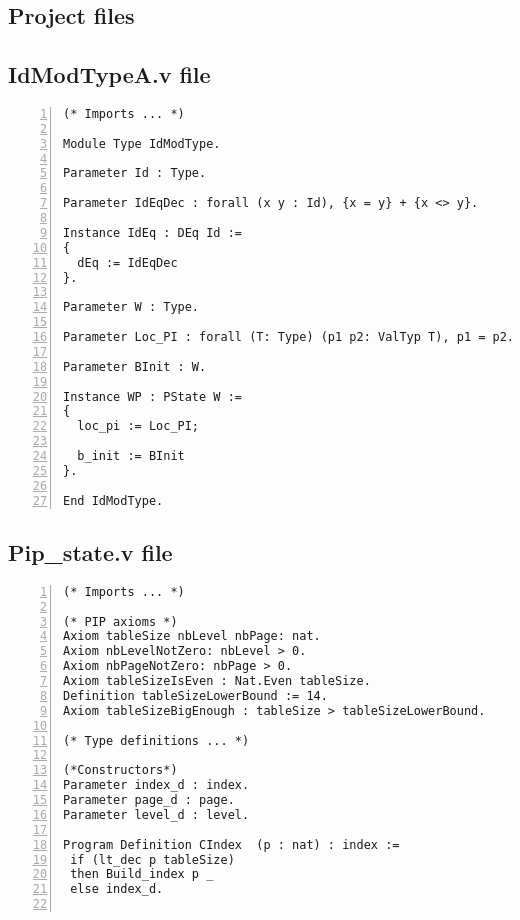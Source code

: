 \begin{appendices}

\chapter{Project files}

\section{IdModTypeA.v file} \label{ModType}
\begin{lstlisting}[xleftmargin=-.1\textwidth,
xrightmargin=-.1\textwidth,
mathescape=true,numbers=left]
(* Imports ... *)

Module Type IdModType.

Parameter Id : Type.

Parameter IdEqDec : forall (x y : Id), {x = y} + {x <> y}.

Instance IdEq : DEq Id :=
{
  dEq := IdEqDec
}.

Parameter W : Type.

Parameter Loc_PI : forall (T: Type) (p1 p2: ValTyp T), p1 = p2.

Parameter BInit : W.

Instance WP : PState W :=
{
  loc_pi := Loc_PI;
  
  b_init := BInit
}.              
  
End IdModType.
\end{lstlisting}
\pagebreak

\section{Pip\_state.v file} \label{stateFile}
\begin{lstlisting}[xleftmargin=-.1\textwidth,
xrightmargin=-.1\textwidth,
mathescape=true,numbers=left]
(* Imports ... *)

(* PIP axioms *)
Axiom tableSize nbLevel nbPage: nat.
Axiom nbLevelNotZero: nbLevel > 0.
Axiom nbPageNotZero: nbPage > 0.
Axiom tableSizeIsEven : Nat.Even tableSize.
Definition tableSizeLowerBound := 14.  
Axiom tableSizeBigEnough : tableSize > tableSizeLowerBound. 

(* Type definitions ... *)

(*Constructors*)
Parameter index_d : index.
Parameter page_d : page.
Parameter level_d : level.

Program Definition CIndex  (p : nat) : index := 
 if (lt_dec p tableSize) 
 then Build_index p _ 
 else index_d.


\end{lstlisting}
\end{appendices}
